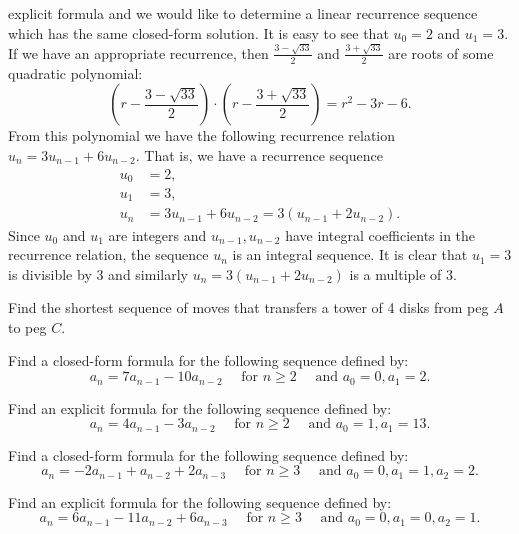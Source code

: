 explicit formula and we would like to determine a linear recurrence sequence which has the same closed-form
solution. It is easy to see that $u_0=2$ and $u_1=3$. If we have an appropriate recurrence, then $\frac{3-\sqrt{33}}{2}$
and $\frac{3+\sqrt{33}}{2}$ are roots of some quadratic polynomial:
$$
\left(r-\frac{3-\sqrt{33}}{2}\right)\cdot \left(r-\frac{3+\sqrt{33}}{2}\right)=r^2-3r-6.
$$
From this polynomial we have the following recurrence relation $u_n=3u_{n-1}+6u_{n-2}$.
That is, we have a recurrence sequence
\begin{align*}
u_0&=2,\\
u_1&=3,\\
u_n&=3u_{n-1}+6u_{n-2}=3(u_{n-1}+2u_{n-2}).
\end{align*}
Since $u_0$ and $u_1$ are integers and $u_{n-1},u_{n-2}$ have integral coefficients in the recurrence relation, the sequence $u_n$
is an integral sequence. It is clear that $u_1=3$ is divisible by 3 and similarly $u_n=3(u_{n-1}+2u_{n-2})$ is a multiple of 3.

\begin{exercise}\label{seq-ex-1}
Find the shortest sequence of moves that transfers a tower of 4
disks from peg $A$ to peg $C$.
\end{exercise}

\begin{exercise}\label{seq-ex-2}
Find a closed-form formula for the following sequence defined by:
$$
a_n=7a_{n-1}-10a_{n-2}\quad\mbox{ for }n\geq 2\quad\mbox{ and }a_0=0,a_1=2.
$$
\end{exercise}

\begin{exercise}\label{seq-ex-3}
Find an explicit formula for the following sequence defined by:
$$
a_n=4a_{n-1}-3a_{n-2}\quad\mbox{ for }n\geq 2\quad\mbox{ and }a_0=1,a_1=13.
$$
\end{exercise}

\begin{exercise}\label{seq-ex-4}
Find a closed-form formula for the following sequence defined by:
$$
a_n=-2a_{n-1}+a_{n-2}+2a_{n-3}\quad\mbox{ for }n\geq 3\quad\mbox{ and }a_0=0,a_1=1,a_2=2.
$$
\end{exercise}

\begin{exercise}\label{seq-ex-5}
Find an explicit formula for the following sequence defined by:
$$
a_n=6a_{n-1}-11a_{n-2}+6a_{n-3}\quad\mbox{ for }n\geq 3\quad\mbox{ and }a_0=0,a_1=0,a_2=1.
$$
\end{exercise}

